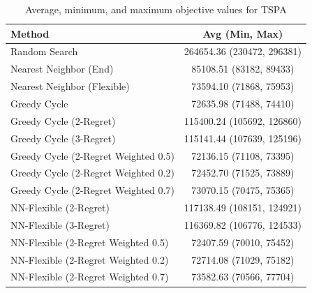 \begin{table}[h!]
\centering
\begin{tabular}{lc}
\hline
Method & Avg (Min, Max) \\
\hline
Random Search & 264654.36 (230472, 296381) \\
Nearest Neighbor (End) & 85108.51 (83182, 89433) \\
Nearest Neighbor (Flexible) & 73594.10 (71868, 75953) \\
Greedy Cycle & 72635.98 (71488, 74410) \\
Greedy Cycle (2-Regret) & 115400.24 (105692, 126860) \\
Greedy Cycle (3-Regret) & 115141.44 (107639, 125196) \\
Greedy Cycle (2-Regret Weighted 0.5) & 72136.15 (71108, 73395) \\
Greedy Cycle (2-Regret Weighted 0.2) & 72452.70 (71525, 73889) \\
Greedy Cycle (2-Regret Weighted 0.7) & 73070.15 (70475, 75365) \\
NN-Flexible (2-Regret) & 117138.49 (108151, 124921) \\
NN-Flexible (3-Regret) & 116369.82 (106776, 124533) \\
NN-Flexible (2-Regret Weighted 0.5) & 72407.59 (70010, 75452) \\
NN-Flexible (2-Regret Weighted 0.2) & 72714.08 (71029, 75182) \\
NN-Flexible (2-Regret Weighted 0.7) & 73582.63 (70566, 77704) \\
\hline
\end{tabular}
\caption{Average, minimum, and maximum objective values for TSPA}
\label{tab:TSPA_results}
\end{table}
